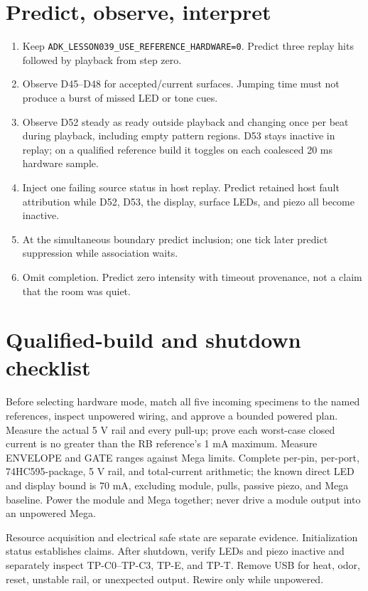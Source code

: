 \documentclass[11pt]{article}
\begin{document}
\section{Predict, observe, interpret}
\begin{enumerate}
 \item Keep \texttt{ADK\_LESSON039\_USE\_REFERENCE\_HARDWARE=0}.
       Predict three replay hits followed by playback from step zero.
 \item Observe D45--D48 for accepted/current surfaces. Jumping time must not
       produce a burst of missed LED or tone cues.
 \item Observe D52 steady as ready outside playback and changing once per beat
       during playback, including empty pattern regions. D53 stays inactive
       in replay; on a qualified reference build it toggles on each coalesced
       20 ms hardware sample.
 \item Inject one failing source status in host replay. Predict retained host
       fault attribution while D52, D53, the display, surface LEDs, and piezo
       all become inactive.
 \item At the simultaneous boundary predict inclusion; one tick later predict
       suppression while association waits.
 \item Omit completion. Predict zero intensity with timeout provenance, not a
       claim that the room was quiet.
\end{enumerate}

\section{Qualified-build and shutdown checklist}
Before selecting hardware mode, match all five incoming specimens to the
named references, inspect unpowered wiring, and approve a bounded powered
plan. Measure the actual 5 V rail and every pull-up; prove each worst-case
closed current is no greater than the RB reference's 1 mA maximum. Measure
ENVELOPE and GATE ranges against Mega limits. Complete per-pin, per-port,
74HC595-package, 5 V rail, and total-current arithmetic; the known direct LED
and display bound is 70 mA, excluding module, pulls, passive piezo, and Mega
baseline. Power the module and Mega together; never drive a module output into
an unpowered Mega.

Resource acquisition and electrical safe state are separate evidence.
Initialization status establishes claims. After shutdown, verify LEDs and
piezo inactive and separately inspect TP-C0--TP-C3, TP-E, and TP-T. Remove USB
for heat, odor, reset, unstable rail, or unexpected output. Rewire only while
unpowered.
\end{document}
